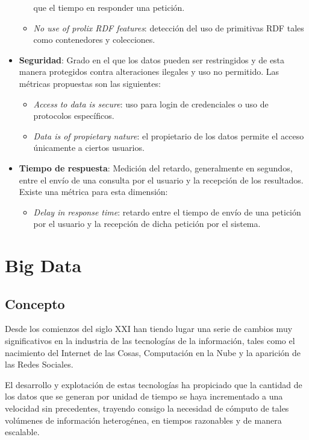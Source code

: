 \begin{itemize}
\begin{itemize}
    que el tiempo en responder una petición. 
  \item \textit{No use of prolix \acs{RDF} features}: detección del uso de
    primitivas \acs{RDF} tales como contenedores y colecciones. 
  \end{itemize}
\item \textbf{Seguridad}: Grado en el que los datos pueden ser restringidos y de
  esta manera protegidos contra alteraciones ilegales y uso no permitido. Las
  métricas propuestas son las siguientes:
  \begin{itemize}
  \item \textit{Access to data is secure}: uso para login de credenciales o uso
    de protocolos específicos. 
  \item \textit{Data is of propietary nature}: el propietario de los datos
    permite el acceso únicamente a ciertos usuarios. 
  \end{itemize}
\item \textbf{Tiempo de respuesta}: Medición del retardo, generalmente en
  segundos, entre el envío de una consulta por el usuario y la recepción de los
  resultados. Existe una métrica para esta dimensión:

  \begin{itemize}
  \item \textit{Delay in response time}: retardo entre el tiempo de envío de una
    petición por el usuario y la recepción de dicha petición por el sistema. 
  \end{itemize}

\end{itemize}

\section{Big Data}

\subsection{Concepto}

Desde los comienzos del siglo XXI han tiendo lugar una serie de cambios muy
significativos en la industria de las tecnologías de la información, tales como
el nacimiento del Internet de las Cosas, Computación en la Nube y la aparición
de las Redes Sociales.

El desarrollo y explotación de estas tecnologías ha propiciado que la cantidad
de los datos que se generan por unidad de tiempo se haya incrementado a una
velocidad sin precedentes, trayendo consigo la necesidad de cómputo de tales
volúmenes de información heterogénea, en tiempos razonables y de manera escalable.

